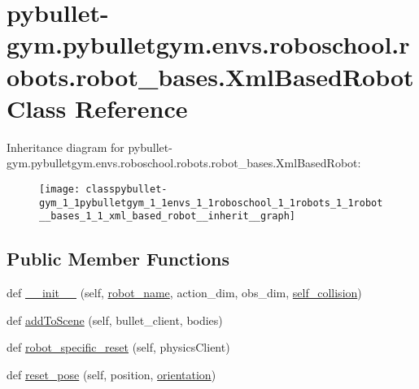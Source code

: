 \hypertarget{classpybullet-gym_1_1pybulletgym_1_1envs_1_1roboschool_1_1robots_1_1robot__bases_1_1_xml_based_robot}{}\section{pybullet-\/gym.pybulletgym.\+envs.\+roboschool.\+robots.\+robot\+\_\+bases.\+Xml\+Based\+Robot Class Reference}
\label{classpybullet-gym_1_1pybulletgym_1_1envs_1_1roboschool_1_1robots_1_1robot__bases_1_1_xml_based_robot}


Inheritance diagram for pybullet-\/gym.pybulletgym.\+envs.\+roboschool.\+robots.\+robot\+\_\+bases.\+Xml\+Based\+Robot\+:
\nopagebreak
\begin{figure}[H]
\begin{center}
\leavevmode
\texttt{[image: classpybullet-gym\_1\_1pybulletgym\_1\_1envs\_1\_1roboschool\_1\_1robots\_1\_1robot\_\_bases\_1\_1\_xml\_based\_robot\_\_inherit\_\_graph]}
\end{center}
\end{figure}
\subsection*{Public Member Functions}
\begin{DoxyCompactItemize}
\item 
def \hyperlink{classpybullet-gym_1_1pybulletgym_1_1envs_1_1roboschool_1_1robots_1_1robot__bases_1_1_xml_based_robot_aa28b5480b2f084ba2497584b0f16cd8f}{\+\_\+\+\_\+init\+\_\+\+\_\+} (self, \hyperlink{classpybullet-gym_1_1pybulletgym_1_1envs_1_1roboschool_1_1robots_1_1robot__bases_1_1_xml_based_robot_a27a9dfbfbfd4f3478cc4ea4ace80af97}{robot\+\_\+name}, action\+\_\+dim, obs\+\_\+dim, \hyperlink{classpybullet-gym_1_1pybulletgym_1_1envs_1_1roboschool_1_1robots_1_1robot__bases_1_1_xml_based_robot_ab6ba95cc9efcb674bb70711d09755b02}{self\+\_\+collision})
\item 
def \hyperlink{classpybullet-gym_1_1pybulletgym_1_1envs_1_1roboschool_1_1robots_1_1robot__bases_1_1_xml_based_robot_a22c5d2b6372debf0b6d48ddc3504da5d}{add\+To\+Scene} (self, bullet\+\_\+client, bodies)
\item 
def \hyperlink{classpybullet-gym_1_1pybulletgym_1_1envs_1_1roboschool_1_1robots_1_1robot__bases_1_1_xml_based_robot_a047edff4b735da6a9b453df63a21b67d}{robot\+\_\+specific\+\_\+reset} (self, physics\+Client)
\item 
def \hyperlink{classpybullet-gym_1_1pybulletgym_1_1envs_1_1roboschool_1_1robots_1_1robot__bases_1_1_xml_based_robot_a85a554a17ab7e36efd2f59a1aa8248da}{reset\+\_\+pose} (self, position, \hyperlink{namespacepybullet-gym_1_1pybulletgym_1_1envs_1_1roboschool_1_1robots_1_1robot__bases_abd4cbcc66314feda5543ea5221592127}{orientation})
\end{DoxyCompactItemize}
